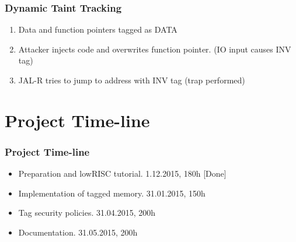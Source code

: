 \documentclass{beamer}
\begin{document}
\begin{frame}
	\frametitle{Dynamic Taint Tracking}
	\begin{enumerate}
	\item Data and function pointers tagged as DATA
	\item Attacker injects code and overwrites function pointer. (IO input causes INV tag)
	\item JAL-R tries to jump to address with INV tag (trap performed)
	\end{enumerate}
	\begin{figure}[!h]
		\begin{center}
	\end{center}
	\end{figure}
\end{frame}

\section{Project Time-line}

\begin{frame}
	\frametitle{Project Time-line}
   \begin{itemize}
   	  \item Preparation and lowRISC tutorial. 1.12.2015, 180h [Done]
	   \item Implementation of tagged memory. 31.01.2015, 150h
	   \item Tag security policies. 31.04.2015, 200h
		\item Documentation. 31.05.2015, 200h
   \end{itemize}
\end{frame}




\end{document}
